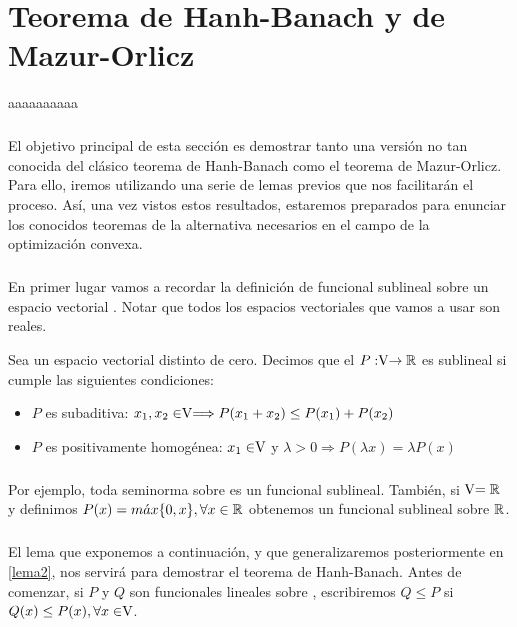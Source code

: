 \chapter*{Teorema de Hanh-Banach y de Mazur-Orlicz}
	\thispagestyle{empty}

aaaaaaaaaa
	\paragraph{}El objetivo principal de esta sección es demostrar tanto una versión no tan conocida del clásico teorema de Hanh-Banach como el teorema de Mazur-Orlicz. Para ello, iremos utilizando una serie de lemas previos que nos facilitarán el proceso. Así, una vez vistos estos resultados, estaremos preparados para enunciar los conocidos teoremas de la alternativa necesarios en el campo de la optimización convexa.
	
	\paragraph{} En primer lugar vamos a recordar la definición de funcional sublineal sobre un espacio vectorial \vecSpace . Notar que todos los espacios vectoriales que vamos a usar son reales.  
	
	\begin{definicion}
		Sea \vecSpace un espacio vectorial distinto de cero. Decimos que el $P:\vecSpace \rightarrow \RR$ es sublineal si cumple las siguientes condiciones:
		\begin{itemize}
			\item $ P $ es subaditiva: $x_1, x_2 \in \vecSpace \Longrightarrow P(x_1 + x_2) \leq P(x_1) + P(x_2) $
			\item $ P $ es positivamente homogénea: $x_1 \in \vecSpace $ y $ \lambda > 0 \Longrightarrow P(\lambda x) = \lambda P(x) $
		\end{itemize}
	\end{definicion}

	\paragraph{}Por ejemplo, toda seminorma sobre \vecSpace es un funcional sublineal. También, si $ \vecSpace = \RR $ y definimos $ P(x) = m\acute{a}x \{0,x\}, \forall x \in \mathbb{R} $ obtenemos un funcional sublineal sobre $\mathbb{R}$.
	
	\paragraph{} El lema que exponemos a continuación, y que generalizaremos posteriormente en \ref{lema2}, nos servirá para demostrar el teorema de Hanh-Banach. Antes de comenzar, si $ P $ y $ Q $ son funcionales lineales sobre \vecSpace, escribiremos $ Q \leq P $ si $ Q(x) \leq P(x), \forall x \in \vecSpace $.
	
